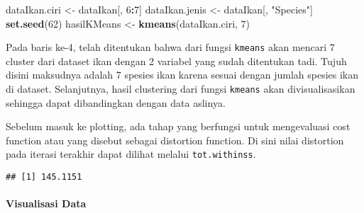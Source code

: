 \documentclass[
]{article}
\newenvironment{Shaded}{\begin{snugshade}}{\end{snugshade}}
\newcommand{\DataTypeTok}[1]{\textcolor[rgb]{0.13,0.29,0.53}{#1}}
\newcommand{\DecValTok}[1]{\textcolor[rgb]{0.00,0.00,0.81}{#1}}
\newcommand{\KeywordTok}[1]{\textcolor[rgb]{0.13,0.29,0.53}{\textbf{#1}}}
\newcommand{\NormalTok}[1]{#1}
\newcommand{\OperatorTok}[1]{\textcolor[rgb]{0.81,0.36,0.00}{\textbf{#1}}}
\newcommand{\StringTok}[1]{\textcolor[rgb]{0.31,0.60,0.02}{#1}}
\begin{document}
\begin{Shaded}
\begin{Highlighting}[numbers=left,,]
\NormalTok{dataIkan.ciri <-}\StringTok{ }\NormalTok{dataIkan[, }\DecValTok{6}\OperatorTok{:}\DecValTok{7}\NormalTok{]}
\NormalTok{dataIkan.jenis <-}\StringTok{ }\NormalTok{dataIkan[, }\StringTok{"Species"}\NormalTok{]}
\KeywordTok{set.seed}\NormalTok{(}\DecValTok{62}\NormalTok{)}
\NormalTok{hasilKMeans <-}\StringTok{ }\KeywordTok{kmeans}\NormalTok{(dataIkan.ciri, }\DecValTok{7}\NormalTok{)}
\end{Highlighting}
\end{Shaded}

Pada baris ke-4, telah ditentukan bahwa dari fungsi \texttt{kmeans} akan
mencari 7 cluster dari dataset ikan dengan 2 variabel yang sudah
ditentukan tadi. Tujuh disini maksudnya adalah 7 spesies ikan karena
sesuai dengan jumlah spesies ikan di dataset. Selanjutnya, hasil
clustering dari fungsi \texttt{kmeans} akan divisualisasikan sehingga
dapat dibandingkan dengan data aslinya.

Sebelum masuk ke plotting, ada tahap yang berfungsi untuk mengevaluasi
cost function atau yang disebut sebagai distortion function. Di sini
nilai distortion pada iterasi terakhir dapat dilihat melalui
\texttt{tot.withinss}.

\begin{Shaded}
\end{Shaded}

\begin{verbatim}
## [1] 145.1151
\end{verbatim}

\hypertarget{visualisasi-data}{%
\paragraph{Visualisasi Data}\label{visualisasi-data}}

\begin{Shaded}
\end{Shaded}
\end{document}
